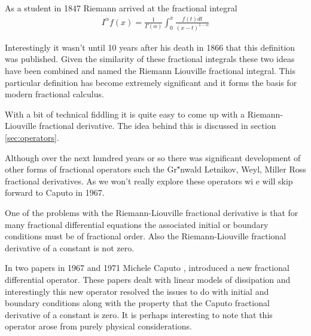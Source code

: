 As a student in 1847 Riemann arrived at the fractional integral
\begin{align}
	I^\alpha f(x) = \frac{1}{\Gamma(\alpha)} \int_0^x \frac{f(t)dt}{(x-t)^{1-\alpha}}
\end{align}

Interestingly it wasn't until 10 years after his death in 1866 that this definition was published. Given the similarity of these fractional integrals these two ideas have been combined and named the Riemann Liouville fractional integral. This particular definition has become extremely significant and it forms the basis for modern fractional calculus. 

With a bit of technical fiddling it is quite easy to come up with a Riemann-Liouville fractional derivative. The idea behind this is discussed in section \ref{sec:operators}.

Although over the next hundred years or so there was significant development of other forms of fractional operators such the Gr{\u"}nwald Letnikov, Weyl, Miller Ross fractional derivatives. As we won't really explore these operators wi e will skip forward to Caputo in 1967. 

One of the problems with the Riemann-Liouville fractional derivative is that for many fractional differential equations the associated initial or boundary conditions must be of fractional order. Also the Riemann-Liouville fractional derivative of a constant is not zero. 

In two papers in 1967 and 1971 Michele Caputo\cite{Caputo1967} \cite{Caputo1971}, introduced a new fractional differential operator. These papers dealt with linear models of dissipation and interestingly this new operator resolved the issues to do with initial and boundary conditions along with the property that the Caputo fractional derivative of a constant is zero. It is perhaps interesting to note that this operator arose from purely physical considerations. 

\clearpage
